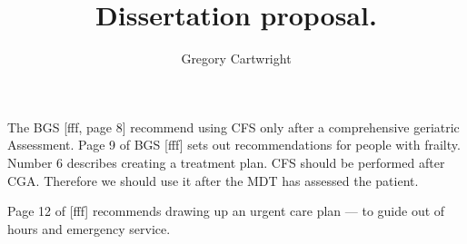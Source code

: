 \documentclass[12pt,a4paper,oneside,titlepage]{article}
\begin{document}
\author{Gregory Cartwright}
\title{Dissertation proposal.}
\maketitle
The \cite{bgs:14} BGS [fff, page 8] recommend using CFS only after a comprehensive geriatric Assessment.
Page 9 of BGS [fff] sets out recommendations for people with frailty.
Number 6 describes creating a treatment plan.
CFS should be performed after CGA. Therefore we should use it after the MDT has assessed the patient.

Page 12 of [fff] recommends drawing up an urgent care plan --- to guide out of hours and emergency service.
\end{document}
